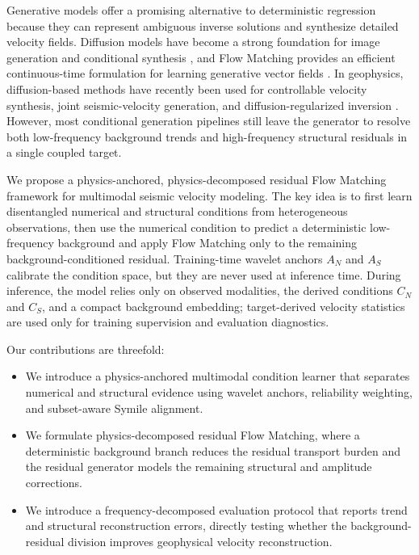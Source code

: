 \documentclass[letterpaper]{article}
\begin{document}
Generative models offer a promising alternative to deterministic regression because they can represent ambiguous inverse solutions and synthesize detailed velocity fields. Diffusion models have become a strong foundation for image generation and conditional synthesis \citep{ho2020ddpm,rombach2022ldm,zhang2023controlnet}, and Flow Matching provides an efficient continuous-time formulation for learning generative vector fields \citep{lipman2023flowmatching}. In geophysics, diffusion-based methods have recently been used for controllable velocity synthesis, joint seismic-velocity generation, and diffusion-regularized inversion \citep{wang2024controllable,wang2024wavediffusion,shan2026reddiffeq}. However, most conditional generation pipelines still leave the generator to resolve both low-frequency background trends and high-frequency structural residuals in a single coupled target.

We propose a physics-anchored, physics-decomposed residual Flow Matching framework for multimodal seismic velocity modeling. The key idea is to first learn disentangled numerical and structural conditions from heterogeneous observations, then use the numerical condition to predict a deterministic low-frequency background and apply Flow Matching only to the remaining background-conditioned residual. Training-time wavelet anchors $A_N$ and $A_S$ calibrate the condition space, but they are never used at inference time. During inference, the model relies only on observed modalities, the derived conditions $C_N$ and $C_S$, and a compact background embedding; target-derived velocity statistics are used only for training supervision and evaluation diagnostics.

Our contributions are threefold:
\begin{itemize}
\item We introduce a physics-anchored multimodal condition learner that separates numerical and structural evidence using wavelet anchors, reliability weighting, and subset-aware Symile alignment.
\item We formulate physics-decomposed residual Flow Matching, where a deterministic background branch reduces the residual transport burden and the residual generator models the remaining structural and amplitude corrections.
\item We introduce a frequency-decomposed evaluation protocol that reports trend and structural reconstruction errors, directly testing whether the background-residual division improves geophysical velocity reconstruction.
\end{itemize}
\end{document}
